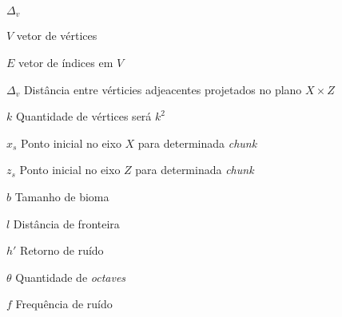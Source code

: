 \documentclass[tg]{mdtuffs}
\begin{document}
\begin{listofsymbols}{$\Delta_{v}$}
    \item [$V$] vetor de vértices
    \item [$E$] vetor de índices em $V$
    \item [$\Delta_{v}$] Distância entre vérticies adjeacentes projetados no plano $X \times Z$
    \item [$k$] Quantidade de vértices será $k^2$
    \item [$x_{s}$] Ponto inicial no eixo $X$ para determinada \textit{chunk}
    \item [$z_{s}$] Ponto inicial no eixo $Z$ para determinada \textit{chunk}
    \item [$b$] Tamanho de bioma
    \item [$l$] Distância de fronteira
    \item [$h'$] Retorno de ruído
    \item [$\theta$] Quantidade de \textit{octaves}
    \item [$f$] Frequência de ruído
    
\end{listofsymbols}

\tableofcontents


\setlength{\baselineskip}{1.5\baselineskip}



%




\setlength{\baselineskip}{\baselineskip}

%


\end{document}
